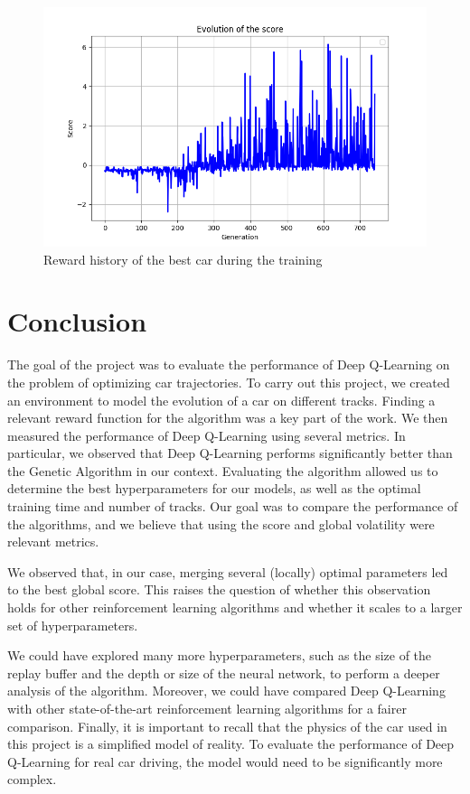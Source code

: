 \documentclass[11pt,a4paper]{article}
\newcounter{fig}
\begin{document}
        \begin{figure}[h]
            \centering
            \includegraphics[scale=0.6]{reward best car.png}
            \caption{Reward history of the best car during the training}
            \label{figure:Best_car_reward}
        \end{figure}

\newpage
    \section*{Conclusion}

    The goal of the project was to evaluate the performance of Deep Q-Learning on the problem of optimizing car trajectories. To carry out this project, we created an environment to model the evolution of a car on different tracks. Finding a relevant reward function for the algorithm was a key part of the work.
    We then measured the performance of Deep Q-Learning using several metrics. In particular, we observed that Deep Q-Learning performs significantly better than the Genetic Algorithm in our context. Evaluating the algorithm allowed us to determine the best hyperparameters for our models, as well as the optimal training time and number of tracks. Our goal was to compare the performance of the algorithms, and we believe that using the score and global volatility were relevant metrics.
    
    We observed that, in our case, merging several (locally) optimal parameters led to the best global score. This raises the question of whether this observation holds for other reinforcement learning algorithms and whether it scales to a larger set of hyperparameters.
    
    We could have explored many more hyperparameters, such as the size of the replay buffer and the depth or size of the neural network, to perform a deeper analysis of the algorithm. Moreover, we could have compared Deep Q-Learning with other state-of-the-art reinforcement learning algorithms for a fairer comparison. Finally, it is important to recall that the physics of the car used in this project is a simplified model of reality. To evaluate the performance of Deep Q-Learning for real car driving, the model would need to be significantly more complex.
    
\end{document}
